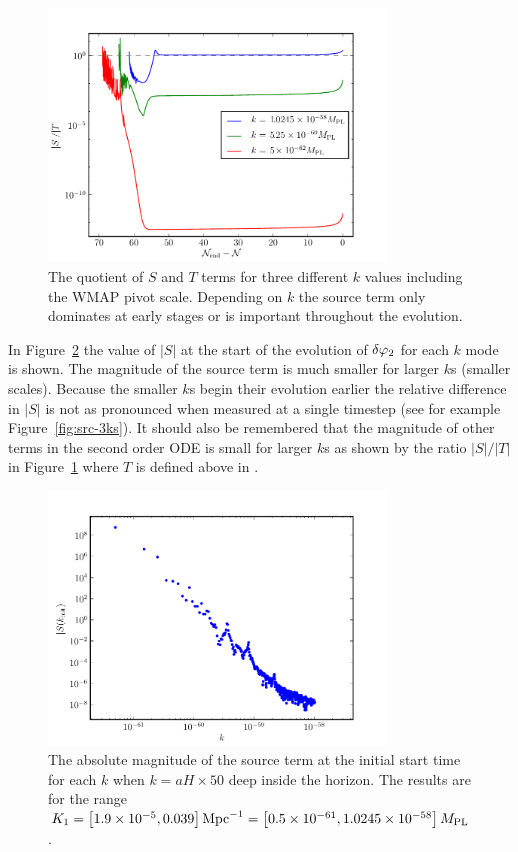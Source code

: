 \begin{figure}
\centering
 \includegraphics[width=0.8\textwidth]{numerical/graphs/s-over-t-3ks-large}
\caption[Quotient of $S$ and $T$]{The quotient of $S$ and $T$ terms for three
different $k$ values
including the WMAP pivot scale. Depending on $k$ the source term only dominates
at early stages or is important throughout the evolution.}
 \label{fig:s-over-t-3ks}
\end{figure}
% 
% 


In Figure~\ref{fig:src-kinit} the value of $|S|$ at the start of the evolution
of $\delta\varphi_{2}$ for each $k$ mode is shown. The magnitude of the source term is much
smaller for larger $k$s (smaller scales). 
Because the smaller $k$s begin their evolution earlier the relative difference
in $|S|$ is not as pronounced when measured at a single timestep (see for example
Figure~\ref{fig:src-3ks}).
It should also be remembered that the magnitude of other terms in the second
order ODE is small for larger $k$s as shown by the ratio $|S|/|T|$ in
Figure~\ref{fig:s-over-t-3ks} where $T$ is defined above in .
% 
\begin{figure}
\centering
\includegraphics[width=0.8\textwidth]{numerical/graphs/src_kinit_log}
 \caption[Source term at initial start times]{The absolute magnitude of the source 
term at the initial start time for each $k$ when $k = aH \times 50$ deep inside the
horizon. The results are for the range $K_1=\left[ 1.9\times 10^{-5},
0.039 \right] \mathrm{Mpc}^{-1}= \left[0.5\times 10^{-61}, 1.0245\times 10^{-58}\right]M_{\mathrm{PL}}$.}
\label{fig:src-kinit}
\end{figure}
% 

